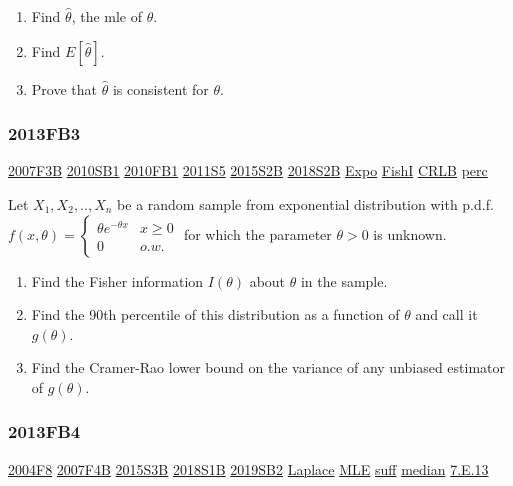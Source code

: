 \documentclass[10pt,twocolumn,portrait]{article}
\begin{document}
\begin{enumerate}
\def\labelenumi{(\alph{enumi})}
\item
  Find \(\hat\theta\), the mle of \(\theta\).
\item
  Find \(E[\hat\theta]\).
\item
  Prove that \(\hat\theta\) is consistent for \(\theta\).
\end{enumerate}

\hypertarget{fb3-2}{%
\subsubsection{2013FB3}\label{fb3-2}}

\protect\hyperlink{f3b}{2007F3B} \protect\hyperlink{sb1-1}{2010SB1}
\protect\hyperlink{fb1-1}{2010FB1} \protect\hyperlink{s5-2}{2011S5}
\protect\hyperlink{s2b-1}{2015S2B} \protect\hyperlink{s2b-2}{2018S2B}
\protect\hyperlink{Expo}{Expo} \protect\hyperlink{section-5}{FishI}
\protect\hyperlink{section-5}{CRLB} \protect\hyperlink{perc}{perc}

Let \(X_1,X_2,..,X_n\) be a random sample from exponential distribution
with p.d.f.
\(f(x,\theta)=\begin{cases}\theta e^{-\theta x}& x\ge0\\0& o.w.\end{cases}\)
for which the parameter \(\theta>0\) is unknown.

\begin{enumerate}
\def\labelenumi{(\alph{enumi})}
\item
  Find the Fisher information \(I(\theta)\) about \(\theta\) in the
  sample.
\item
  Find the 90th percentile of this distribution as a function of
  \(\theta\) and call it \(g(\theta)\).
\item
  Find the Cramer-Rao lower bound on the variance of any unbiased
  estimator of \(g(\theta)\).
\end{enumerate}

\hypertarget{fb4-2}{%
\subsubsection{2013FB4}\label{fb4-2}}

\protect\hyperlink{f8-2}{2004F8} \protect\hyperlink{f4b}{2007F4B}
\protect\hyperlink{s3b-1}{2015S3B} \protect\hyperlink{s1b-2}{2018S1B}
\protect\hyperlink{sb2-3}{2019SB2} \protect\hyperlink{Laplace}{Laplace}
\protect\hyperlink{MLE}{MLE} \protect\hyperlink{section-6}{suff}
\protect\hyperlink{median}{median} \protect\hyperlink{e.13}{7.E.13}
\end{document}
